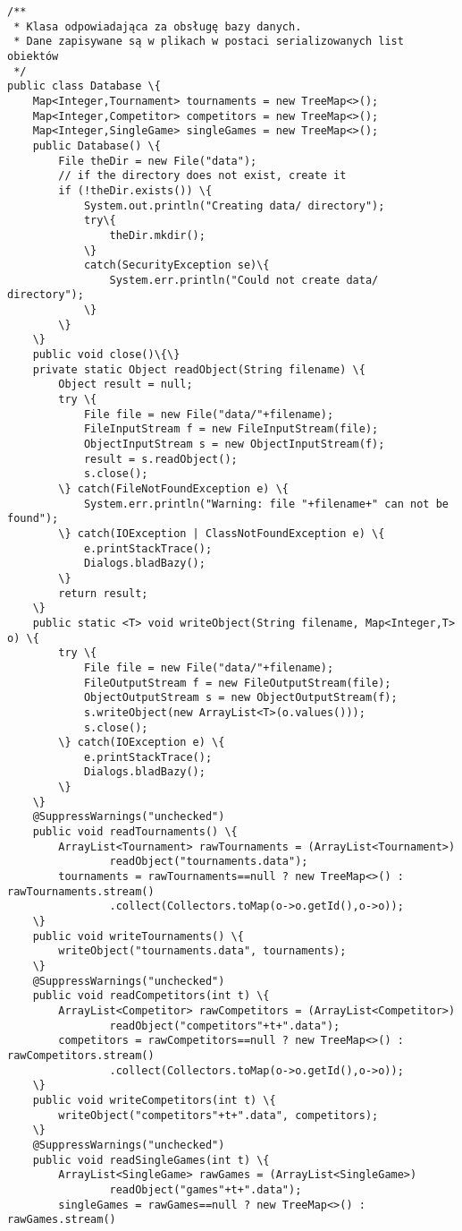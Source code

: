 \begin{verbatim}
/**
 * Klasa odpowiadająca za obsługę bazy danych.
 * Dane zapisywane są w plikach w postaci serializowanych list obiektów
 */
public class Database \{
	Map<Integer,Tournament> tournaments = new TreeMap<>();
	Map<Integer,Competitor> competitors = new TreeMap<>();
	Map<Integer,SingleGame> singleGames = new TreeMap<>();
	public Database() \{
		File theDir = new File("data");
		// if the directory does not exist, create it
		if (!theDir.exists()) \{
		    System.out.println("Creating data/ directory");
		    try\{
		        theDir.mkdir();
		    \} 
		    catch(SecurityException se)\{
		        System.err.println("Could not create data/ directory");
		    \}
		\}
	\}
	public void close()\{\}
	private static Object readObject(String filename) \{
		Object result = null;
		try \{
		    File file = new File("data/"+filename);
		    FileInputStream f = new FileInputStream(file);
		    ObjectInputStream s = new ObjectInputStream(f);
		    result = s.readObject();
		    s.close();
		\} catch(FileNotFoundException e) \{
			System.err.println("Warning: file "+filename+" can not be found");
		\} catch(IOException | ClassNotFoundException e) \{
			e.printStackTrace();
			Dialogs.bladBazy();
		\}
		return result;
	\}
	public static <T> void writeObject(String filename, Map<Integer,T> o) \{
		try \{
	        File file = new File("data/"+filename);
	        FileOutputStream f = new FileOutputStream(file);
	        ObjectOutputStream s = new ObjectOutputStream(f);
	        s.writeObject(new ArrayList<T>(o.values()));
	        s.close();
		\} catch(IOException e) \{
			e.printStackTrace();
			Dialogs.bladBazy();
		\}
	\}
	@SuppressWarnings("unchecked")
	public void readTournaments() \{
		ArrayList<Tournament> rawTournaments = (ArrayList<Tournament>) 
				readObject("tournaments.data");
		tournaments = rawTournaments==null ? new TreeMap<>() : rawTournaments.stream()
				.collect(Collectors.toMap(o->o.getId(),o->o));
	\}
	public void writeTournaments() \{
		writeObject("tournaments.data", tournaments);
	\}
	@SuppressWarnings("unchecked")
	public void readCompetitors(int t) \{
		ArrayList<Competitor> rawCompetitors = (ArrayList<Competitor>) 
				readObject("competitors"+t+".data");
		competitors = rawCompetitors==null ? new TreeMap<>() : rawCompetitors.stream()
				.collect(Collectors.toMap(o->o.getId(),o->o));
	\}
	public void writeCompetitors(int t) \{
		writeObject("competitors"+t+".data", competitors);
	\}
	@SuppressWarnings("unchecked")
	public void readSingleGames(int t) \{
		ArrayList<SingleGame> rawGames = (ArrayList<SingleGame>) 
				readObject("games"+t+".data");
		singleGames = rawGames==null ? new TreeMap<>() : rawGames.stream()

\end{verbatim}
